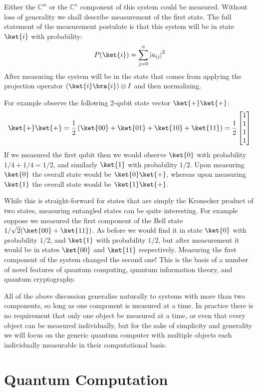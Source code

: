 Either the $\mathbb{C}^m$ or the $\mathbb{C}^n$ component of this system could be measured. Without loss of generality we shall describe measurement of the first state. The full statement of the measurement postulate is that this system will be in state $\ket{i}$ with probability:
\[P(\ket{i}) = \sum_{j=0}^n\ord{a_{ij}}^2\]
After measuring the system will be in the state that comes from applying the projection operator $(\ket{i}\bra{i})\otimes I$ and then normalizing.

For example observe the following 2-qubit state vector $\ket{+}\ket{+}$:
\[\ket{+}\ket{+}=\frac{1}{2}\left(\ket{00}+\ket{01}+\ket{10}+\ket{11}\right)=\frac{1}{2}\left[\begin{matrix}
1\\
1\\
1\\
1
\end{matrix}\right]\]
If we measured the first qubit then we would observe $\ket{0}$ with probability $1/4+1/4 = 1/2$, and similarly $\ket{1}$ with probability $1/2$. Upon measuring $\ket{0}$ the overall state would be $\ket{0}\ket{+}$, whereas upon measuring $\ket{1}$ the overall state would be $\ket{1}\ket{+}$.

While this is straight-forward for states that are simply the Kronecker product of two states, measuring entangled states can be quite interesting. For example suppose we measured the first component of the Bell state $1/\sqrt{2}(\ket{00}+\ket{11})$. As before we would find it in state $\ket{0}$ with probability $1/2$, and $\ket{1}$ with probability $1/2$, but after measurement it would be in states $\ket{00}$ and $\ket{11}$ respectively. Measuring the first component of the system changed the second one! This is the basis of a number of novel features of quantum computing, quantum information theory, and quantum cryptography.

All of the above discussion generalise naturally to systems with more than two components, so long as one component is measured at a time. In practice there is no requirement that only one object be measured at a time, or even that every object can be measured individually, but for the sake of simplicity and generality we will focus on the generic quantum computer with multiple objects each individually measurable in their computational basis.

\section{Quantum Computation}

